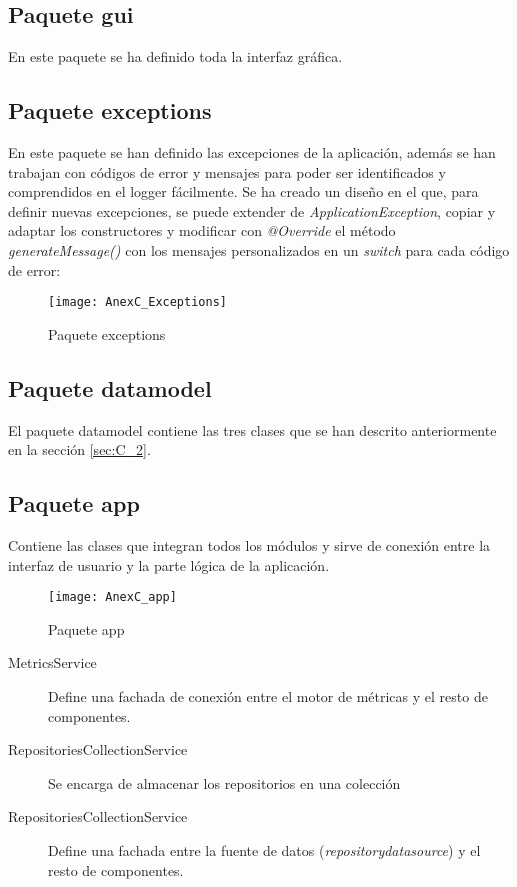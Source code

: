 
\subsection{Paquete gui}
En este paquete se ha definido toda la interfaz gráfica.




\subsection{Paquete exceptions}
En este paquete se han definido las excepciones de la aplicación, además se han trabajan con códigos de error y mensajes para poder ser identificados y comprendidos en el logger fácilmente. Se ha creado un diseño en el que, para definir nuevas excepciones, se puede extender de \textit{ApplicationException}, copiar y adaptar los constructores y modificar con \textit{@Override} el método \textit{generateMessage()} con los mensajes personalizados en un \textit{switch} para cada código de error:

\begin{figure}[!h]
	\centering
	\texttt{[image: AnexC\_Exceptions]}
	\caption{Paquete exceptions}\label{fig:AnexC_Exceptions}
\end{figure}
\FloatBarrier

\subsection{Paquete datamodel}
El paquete datamodel contiene las tres clases que se han descrito anteriormente en la sección \ref{sec:C_2}.

\subsection{Paquete app}
Contiene las clases que integran todos los módulos y sirve de conexión entre la interfaz de usuario y la parte lógica de la aplicación.

\begin{figure}[!h]
	\centering
	\texttt{[image: AnexC\_app]}
	\caption{Paquete app}\label{fig:AnexC_app}
\end{figure}
\FloatBarrier

\begin{description}
	\item[MetricsService] Define una fachada de conexión entre el motor de métricas y el resto de componentes.
	\item[RepositoriesCollectionService] Se encarga de almacenar los repositorios en una colección
	\item[RepositoriesCollectionService] Define una fachada entre la fuente de datos (\textit{repositorydatasource}) y el resto de componentes.
\end{description}

